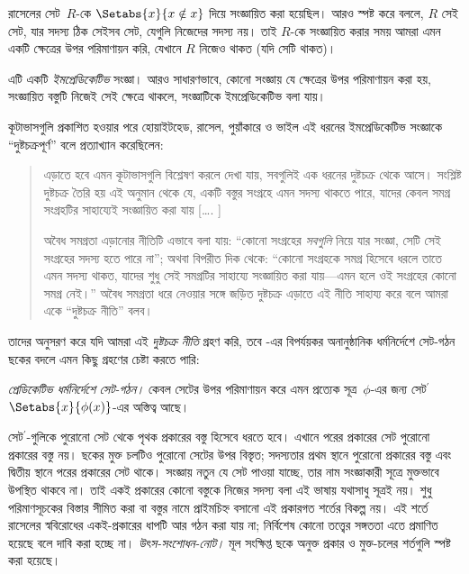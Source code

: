 \documentclass[../../../include/open-logic-section]{subfiles}
\begin{document}


রাসেলের সেট~$R$-কে $\Setabs{x}{x \notin x}$ দিয়ে সংজ্ঞায়িত করা
হয়েছিল। আরও স্পষ্ট করে বললে, $R$ সেই সেট, যার সদস্য ঠিক সেইসব
সেট, যেগুলি নিজেদের সদস্য নয়। তাই $R$-কে সংজ্ঞায়িত করার সময়
আমরা এমন একটি ক্ষেত্রের উপর পরিমাণায়ন করি, যেখানে $R$ নিজেও
থাকত (যদি সেটি থাকত)।

এটি একটি \emph{ইমপ্রেডিকেটিভ} সংজ্ঞা। আরও সাধারণভাবে, কোনো
সংজ্ঞায় যে ক্ষেত্রের উপর পরিমাণায়ন করা হয়, সংজ্ঞায়িত বস্তুটি
নিজেই সেই ক্ষেত্রে থাকলে, সংজ্ঞাটিকে ইমপ্রেডিকেটিভ বলা যায়।

কূটাভাসগুলি প্রকাশিত হওয়ার পরে হোয়াইটহেড, রাসেল, পুয়াঁকারে
ও ভাইল এই ধরনের ইমপ্রেডিকেটিভ সংজ্ঞাকে ``দুষ্টচক্রপূর্ণ'' বলে
প্রত্যাখ্যান করেছিলেন:
\begin{quote}
  এড়াতে হবে এমন কূটাভাসগুলি বিশ্লেষণ করলে দেখা যায়, সবগুলিই
  এক ধরনের দুষ্টচক্র থেকে আসে। সংশ্লিষ্ট দুষ্টচক্র তৈরি হয়
  এই অনুমান থেকে যে, একটি বস্তুর সংগ্রহে এমন সদস্য থাকতে পারে,
  যাদের কেবল সমগ্র সংগ্রহটির সাহায্যেই সংজ্ঞায়িত করা যায়
  [\ldots. \textparagraph]

  অবৈধ সমগ্রতা এড়ানোর নীতিটি এভাবে বলা যায়: ``কোনো সংগ্রহের
  \emph{সবগুলি} নিয়ে যার সংজ্ঞা, সেটি সেই সংগ্রহের সদস্য হতে পারে
  না''; অথবা বিপরীত দিক থেকে: ``কোনো সংগ্রহকে সমগ্র হিসেবে
  ধরলে তাতে এমন সদস্য থাকত, যাদের শুধু সেই সমগ্রটির সাহায্যে
  সংজ্ঞায়িত করা যায়—এমন হলে ওই সংগ্রহের কোনো সমগ্র নেই।''
  অবৈধ সমগ্রতা ধরে নেওয়ার সঙ্গে জড়িত দুষ্টচক্র এড়াতে এই
  নীতি সাহায্য করে বলে আমরা একে ``দুষ্টচক্র নীতি'' বলব।
  \citep[p.~37]{WhiteheadRussell1910}
\end{quote}
তাদের অনুসরণ করে যদি আমরা এই \emph{দুষ্টচক্র নীতি} গ্রহণ করি,
তবে -এর বিপর্যয়কর অনানুষ্ঠানিক
ধর্মনির্দেশে সেট-গঠন ছকের বদলে এমন কিছু গ্রহণের চেষ্টা করতে পারি:

\begin{defish}
\emph{প্রেডিকেটিভ ধর্মনির্দেশে সেট-গঠন।} কেবল সেটের উপর
পরিমাণায়ন করে এমন প্রত্যেক সূত্র~$\phi$-এর জন্য
সেট$^\prime$ $\Setabs{x}{\phi(x)}$-এর অস্তিত্ব আছে।
\end{defish}

সেট$^{\prime}$-গুলিকে পুরোনো সেট থেকে পৃথক প্রকারের বস্তু হিসেবে
ধরতে হবে।
এখানে পরের প্রকারের সেট পুরোনো প্রকারের বস্তু নয়।
ছকের মুক্ত চলটিও পুরোনো সেটের উপর বিস্তৃত; সদস্যতার প্রথম স্থানে
পুরোনো প্রকারের বস্তু এবং দ্বিতীয় স্থানে পরের প্রকারের সেট থাকে।
সংজ্ঞায় নতুন যে সেট পাওয়া যাচ্ছে, তার নাম সংজ্ঞাকারী সূত্রে
মুক্তভাবে উপস্থিত থাকবে না। তাই একই প্রকারের কোনো বস্তুকে নিজের
সদস্য বলা এই ভাষায় যথাসাধু সূত্রই নয়। শুধু পরিমাণসূচকের বিস্তার
সীমিত করা বা বস্তুর নামে প্রাইমচিহ্ন বসানো এই প্রকারগত শর্তের
বিকল্প নয়। এই শর্তে রাসেলের স্ববিরোধের একই-প্রকারের ধাপটি
আর গঠন করা যায় না; নির্বিশেষ কোনো তত্ত্বের সঙ্গততা এতে প্রমাণিত
হয়েছে বলে দাবি করা হচ্ছে না।
\emph{উৎস-সংশোধন-নোট।} মূল সংক্ষিপ্ত ছকে অনুক্ত প্রকার ও
মুক্ত-চলের শর্তগুলি স্পষ্ট করা হয়েছে।
\end{document}
